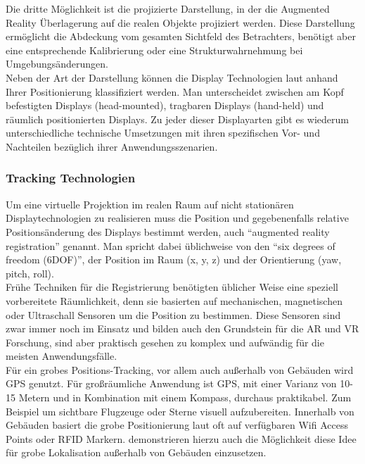 Die dritte Möglichkeit ist die projizierte Darstellung, in der die Augmented Reality Überlagerung auf die realen Objekte projiziert werden. Diese Darstellung ermöglicht die Abdeckung vom gesamten Sichtfeld des Betrachters, benötigt aber eine entsprechende Kalibrierung oder eine Strukturwahrnehmung bei Umgebungsänderungen.\\

Neben der Art der Darstellung können die Display Technologien laut \citet{azuma2001recent} anhand Ihrer Positionierung klassifiziert werden. Man unterscheidet zwischen am Kopf befestigten Displays (head-mounted), tragbaren Displays (hand-held) und räumlich positionierten Displays. Zu jeder dieser Displayarten gibt es wiederum unterschiedliche technische Umsetzungen mit ihren spezifischen Vor- und Nachteilen bezüglich ihrer Anwendungsszenarien.\\

\subsubsection{Tracking Technologien}

Um eine virtuelle Projektion im realen Raum auf nicht stationären Displaytechnologien zu realisieren muss die Position und gegebenenfalls relative Positionsänderung des Displays bestimmt werden, auch \enquote{augmented reality registration} genannt. Man spricht dabei üblichweise von den \enquote{six degrees of freedom (6DOF)}, der Position im Raum (x, y, z) und der Orientierung (yaw, pitch, roll). \\

Frühe Techniken für die Registrierung benötigten üblicher Weise eine speziell vorbereitete Räumlichkeit, denn sie basierten auf mechanischen, magnetischen oder Ultraschall Sensoren um die Position zu bestimmen. Diese Sensoren sind zwar immer noch im Einsatz und bilden auch den Grundstein für die AR und VR Forschung, sind aber praktisch gesehen zu komplex und aufwändig für die meisten Anwendungsfälle. \citep{van2010survey} \\

Für ein grobes Positions-Tracking, vor allem auch außerhalb von Gebäuden wird GPS genutzt. Für großräumliche Anwendung ist GPS, mit einer Varianz von 10-15 Metern und in Kombination mit einem Kompass, durchaus praktikabel. Zum Beispiel um sichtbare Flugzeuge oder Sterne visuell aufzubereiten. Innerhalb von Gebäuden basiert die grobe Positionierung laut \citet{van2010survey} oft auf verfügbaren Wifi Access Points oder RFID Markern. \citet{lamarca2005place} demonstrieren hierzu auch die Möglichkeit diese Idee für grobe Lokalisation außerhalb von Gebäuden einzusetzen.\\

